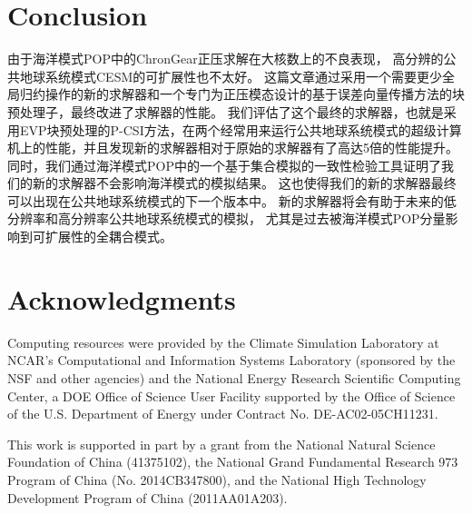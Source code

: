\documentclass{sig-alternate-05-2015}
\begin{document}
\section{Conclusion} \label{se:conc}

 
由于海洋模式POP中的ChronGear正压求解在大核数上的不良表现， 高分辨的公共地球系统模式CESM的可扩展性也不太好。
这篇文章通过采用一个需要更少全局归约操作的新的求解器和一个专门为正压模态设计的基于误差向量传播方法的块预处理子，最终改进了求解器的性能。 
我们评估了这个最终的求解器，也就是采用EVP块预处理的P-CSI方法，在两个经常用来运行公共地球系统模式的超级计算机上的性能，并且发现新的求解器相对于原始的求解器有了高达5倍的性能提升。
同时，我们通过海洋模式POP中的一个基于集合模拟的一致性检验工具证明了我们的新的求解器不会影响海洋模式的模拟结果。 
这也使得我们的新的求解器最终可以出现在公共地球系统模式的下一个版本中。 
新的求解器将会有助于未来的低分辨率和高分辨率公共地球系统模式的模拟， 尤其是过去被海洋模式POP分量影响到可扩展性的全耦合模式。 







\section{Acknowledgments}
Computing resources were provided by the Climate
Simulation Laboratory at NCAR's Computational and Information Systems
Laboratory (sponsored by the NSF and other
agencies) and the National Energy Research Scientific Computing
Center, a DOE Office of Science User Facility supported by the Office
of Science of the U.S. Department of Energy under Contract
No. DE-AC02-05CH11231.

This work is supported in part by a grant from the National Natural Science Foundation
of China (41375102), the National Grand Fundamental Research 973 Program of China (No. 2014CB347800), and the National High Technology Development Program of China
(2011AA01A203).
\end{document}

